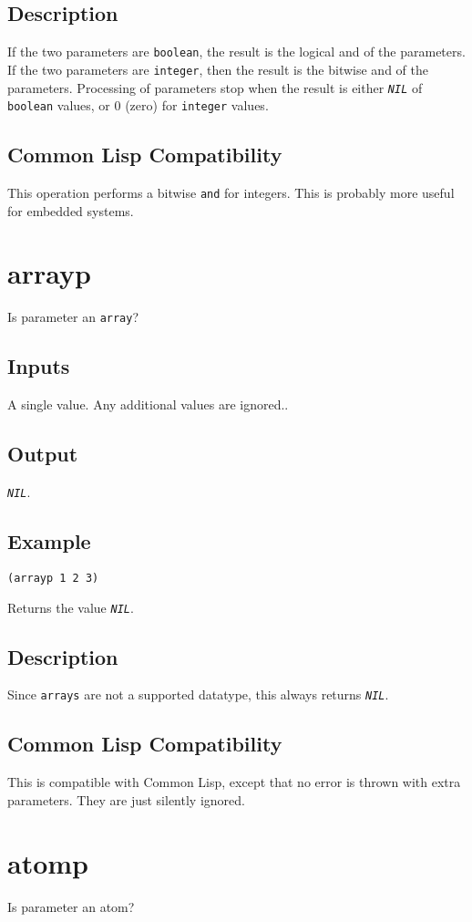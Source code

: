 \documentclass[10pt, openany]{book}
\newcommand{\constant}[1]{\emph{\texttt{#1}}}
\newcommand{\keyword}[1]{\texttt{#1}}
\newcommand{\datatype}[1]{\texttt{#1}}
\newcommand{\cl}{Common Lisp}
\begin{document}
\subsection{Description}
If the two parameters are \datatype{boolean}, the result is the logical and of the parameters.  If the two parameters are \datatype{integer}, then the result is the bitwise and of the parameters.  Processing of parameters stop when the result is either \constant{NIL} of \datatype{boolean} values, or 0 (zero) for \datatype{integer} values.
\subsection{Common Lisp Compatibility}
This operation performs a bitwise \keyword{and} for integers.  This is probably more useful for embedded systems.

\section{arrayp}
Is parameter an \datatype{array}?
\subsection{Inputs}
A single value.  Any additional values are ignored..
\subsection{Output}
\constant{NIL}.
\subsection{Example}
\begin{lstlisting}
(arrayp 1 2 3)
\end{lstlisting}
Returns the value \constant{NIL}.
\subsection{Description}
Since \datatype{arrays} are not a supported datatype, this always returns \constant{NIL}.
\subsection{Common Lisp Compatibility}
This is compatible with \cl, except that no error is thrown with extra parameters.  They are just silently ignored.

\section{atomp}
Is parameter an atom?
\end{document}
